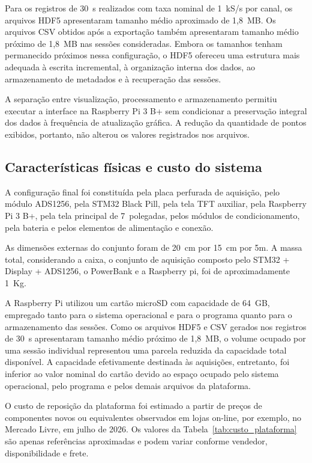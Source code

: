 \documentclass[a4paper,12pt]{fcte}
\begin{document}
Para os registros de 30~s realizados com taxa nominal de 1~kS/s por canal, os arquivos HDF5 apresentaram tamanho médio aproximado de 1,8~MB. Os arquivos CSV obtidos após a exportação também apresentaram tamanho médio próximo de 1,8~MB nas sessões consideradas. Embora os tamanhos tenham permanecido próximos nessa configuração, o HDF5 ofereceu uma estrutura mais adequada à escrita incremental, à organização interna dos dados, ao armazenamento de metadados e à recuperação das sessões.

A separação entre visualização, processamento e armazenamento permitiu executar a interface na Raspberry Pi 3 B+ sem condicionar a preservação integral dos dados à frequência de atualização gráfica. A redução da quantidade de pontos exibidos, portanto, não alterou os valores registrados nos arquivos.

\subsection{Características físicas e custo do sistema}
\label{subsec:caracteristicas_fisicas_custo}

A configuração final foi constituída pela placa perfurada de aquisição, pelo módulo ADS1256, pela STM32 Black Pill, pela tela TFT auxiliar, pela Raspberry Pi 3 B+, pela tela principal de 7~polegadas, pelos módulos de condicionamento, pela bateria e pelos elementos de alimentação e conexão.

As dimensões externas do conjunto foram de 20~cm por 15~cm por 5m. A massa total, considerando a caixa, o conjunto de aquisição composto pelo STM32 + Display + ADS1256, o PowerBank e a Raspberry pi, foi de aproximadamente 1~Kg.

A Raspberry Pi utilizou um cartão microSD com capacidade de 64~GB, empregado tanto para o sistema operacional e para o programa quanto para o armazenamento das sessões. Como os arquivos HDF5 e CSV gerados nos registros de 30~s apresentaram tamanho médio próximo de 1,8~MB, o volume ocupado por uma sessão individual representou uma parcela reduzida da capacidade total disponível. A capacidade efetivamente destinada às aquisições, entretanto, foi inferior ao valor nominal do cartão devido ao espaço ocupado pelo sistema operacional, pelo programa e pelos demais arquivos da plataforma.

O custo de reposição da plataforma foi estimado a partir de preços de componentes novos ou equivalentes observados em lojas on-line, por exemplo, no Mercado Livre, em julho de 2026. Os valores da Tabela~\ref{tab:custo_plataforma} são apenas referências aproximadas e podem variar conforme vendedor, disponibilidade e frete.
\end{document}
